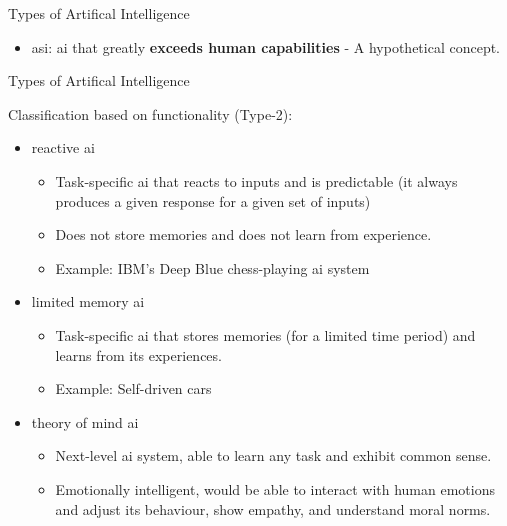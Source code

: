 \begin{frame}{Types of Artifical Intelligence}
\begin{itemize}
        \vspace{0.1cm}
        \item 
        \gls{asi}:
        \gls{ai} that greatly {\bf exceeds human capabilities} - A hypothetical concept.

    \end{itemize}
    
\end{frame}

%

\begin{frame}{Types of Artifical Intelligence}

    Classification based on functionality (Type-2):\\

    \begin{itemize}

        \item 
        \Gls{reactive ai}
        \begin{itemize}
            \item 
            Task-specific \gls{ai} that reacts to inputs and is 
            predictable (it always produces a given response for a given set of inputs)
            \item 
            Does not store memories and does not learn from experience.
            \item
            Example: IBM's Deep Blue chess-playing \gls{ai} system
        \end{itemize}

        \item 
        \Gls{limited memory ai}
        \begin{itemize}
            \item 
            Task-specific \gls{ai} that stores memories (for a limited time period) 
            and learns from its experiences.
            \item
            Example: Self-driven cars
        \end{itemize}

        \item 
        \Gls{theory of mind ai}
        \begin{itemize}
            \item 
            Next-level \gls{ai} system, able to learn any task and exhibit common sense.
            \item 
            Emotionally intelligent, would be able to interact with human emotions
            and adjust its behaviour, show empathy, and understand moral norms.
        \end{itemize}


\end{itemize}
\end{frame}
